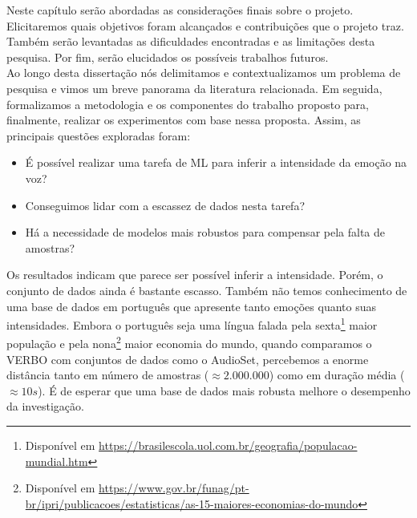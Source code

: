 \label{Cap:Conclusoes}

Neste capítulo serão abordadas as considerações finais sobre o projeto. Elicitaremos quais objetivos foram alcançados e contribuições que o projeto traz. Também serão levantadas as dificuldades encontradas e as limitações desta pesquisa. Por fim, serão elucidados os possíveis trabalhos futuros.\\

Ao longo desta dissertação nós delimitamos e contextualizamos um problema de pesquisa e vimos um breve panorama da literatura relacionada. Em seguida, formalizamos a metodologia e os componentes do trabalho proposto para, finalmente, realizar os experimentos com base nessa proposta. Assim, as principais questões exploradas foram:


\begin{itemize}
    \item É possível realizar uma tarefa de \acrshort{ML} para inferir a intensidade da emoção na voz?
    \item Conseguimos lidar com a escassez de dados nesta tarefa?
    \item Há a necessidade de modelos mais robustos para compensar pela falta de amostras?
\end{itemize}


Os resultados indicam que parece ser possível inferir a intensidade. Porém, o conjunto de dados ainda é bastante escasso. Também não temos conhecimento de uma base de dados em português que apresente tanto emoções quanto suas intensidades. Embora o português seja uma língua falada pela sexta\footnote{Disponível em \url{https://brasilescola.uol.com.br/geografia/populacao-mundial.htm}} maior população e pela nona\footnote{Disponível em \url {https://www.gov.br/funag/pt-br/ipri/publicacoes/estatisticas/as-15-maiores-economias-do-mundo}} maior economia do mundo, quando comparamos o VERBO com conjuntos de dados como o AudioSet, percebemos a enorme distância tanto em número de amostras ($\approx 2.000.000$) como em duração média ($\approx 10s$). É de esperar que uma base de dados mais robusta melhore o desempenho da investigação.

